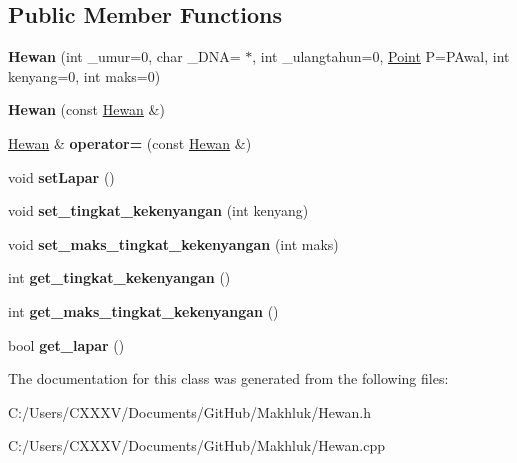 \subsection*{Public Member Functions}
\begin{DoxyCompactItemize}
\item 
{\bfseries Hewan} (int \+\_\+umur=0, char \+\_\+\+D\+NA= \textquotesingle{}$\ast$\textquotesingle{}, int \+\_\+ulangtahun=0, \hyperlink{class_point}{Point} P=P\+Awal, int kenyang=0, int maks=0)\hypertarget{class_hewan_a5ad2b5f8b77059a376e6182277a0324f}{}\label{class_hewan_a5ad2b5f8b77059a376e6182277a0324f}

\item 
{\bfseries Hewan} (const \hyperlink{class_hewan}{Hewan} \&)\hypertarget{class_hewan_a9a7e8b448780d0ebff93d06d82c77795}{}\label{class_hewan_a9a7e8b448780d0ebff93d06d82c77795}

\item 
\hyperlink{class_hewan}{Hewan} \& {\bfseries operator=} (const \hyperlink{class_hewan}{Hewan} \&)\hypertarget{class_hewan_ae6fca2e8de85c914a6ac040a9aea3d58}{}\label{class_hewan_ae6fca2e8de85c914a6ac040a9aea3d58}

\item 
void {\bfseries set\+Lapar} ()\hypertarget{class_hewan_a488b6dde625a4b75f0014856ce5f7a47}{}\label{class_hewan_a488b6dde625a4b75f0014856ce5f7a47}

\item 
void {\bfseries set\+\_\+tingkat\+\_\+kekenyangan} (int kenyang)\hypertarget{class_hewan_a54587f410e4a417aa48baad66e3abeab}{}\label{class_hewan_a54587f410e4a417aa48baad66e3abeab}

\item 
void {\bfseries set\+\_\+maks\+\_\+tingkat\+\_\+kekenyangan} (int maks)\hypertarget{class_hewan_aff60666bdcd276a6d5538905e8132a8e}{}\label{class_hewan_aff60666bdcd276a6d5538905e8132a8e}

\item 
int {\bfseries get\+\_\+tingkat\+\_\+kekenyangan} ()\hypertarget{class_hewan_abf1d8353674e5f68018a68f17804ea96}{}\label{class_hewan_abf1d8353674e5f68018a68f17804ea96}

\item 
int {\bfseries get\+\_\+maks\+\_\+tingkat\+\_\+kekenyangan} ()\hypertarget{class_hewan_ac8d2313e06af76164b7ce143489596f7}{}\label{class_hewan_ac8d2313e06af76164b7ce143489596f7}

\item 
bool {\bfseries get\+\_\+lapar} ()\hypertarget{class_hewan_a79068d1eb649c561b12a92a5de159601}{}\label{class_hewan_a79068d1eb649c561b12a92a5de159601}

\end{DoxyCompactItemize}


The documentation for this class was generated from the following files\+:\begin{DoxyCompactItemize}
\item 
C\+:/\+Users/\+C\+X\+X\+X\+V/\+Documents/\+Git\+Hub/\+Makhluk/Hewan.\+h\item 
C\+:/\+Users/\+C\+X\+X\+X\+V/\+Documents/\+Git\+Hub/\+Makhluk/Hewan.\+cpp\end{DoxyCompactItemize}

